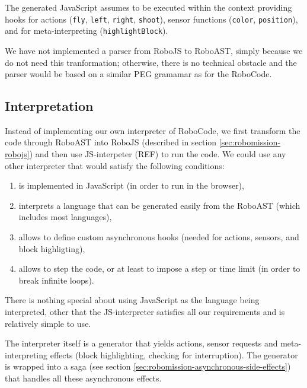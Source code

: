 The generated JavaScript assumes to be executed within the context providing hooks
for actions (\texttt{fly}, \texttt{left}, \texttt{right}, \texttt{shoot}),
sensor functions (\texttt{color}, \texttt{position}),
and for meta-interpreting (\texttt{highlightBlock}).

We have not implemented a parser from RoboJS to RoboAST,
simply because we do not need this tranformation;
otherwise, there is no technical obstacle and the parser would be based on a similar PEG gramamar as for the RoboCode.


\subsection{Interpretation}
\label{sec:robomission-interpretation}

Instead of implementing our own interpreter of RoboCode,
we first transform the code through RoboAST into RoboJS
(described in section \ref{sec:robomission-robojs})
and then use JS-interpeter (REF) to run the code.
We could use any other interpreter that would satisfy the following
conditions:
\begin{enumerate}
\item is implemented in JavaScript (in order to run in the browser),
\item interprets a language that can be generated easily from the RoboAST
  (which includes most languages),
\item allows to define custom asynchronous hooks
  (needed for actions, sensors, and block highligting),
\item allows to step the code, or at least to impose a step or time limit
  (in order to break infinite loops).
\end{enumerate}
There is nothing special about using JavaScript as the language being interpreted,
other that the JS-interpreter satisfies all our requirements
and is relatively simple to use.

The interpreter itself is a generator that yields actions, sensor requests and
meta-interpreting effects (block highlighting, checking for interruption).
The generator is wrapped into a saga
(see section \ref{sec:robomission-asynchronous-side-effects})
that handles all these asynchronous effects.
